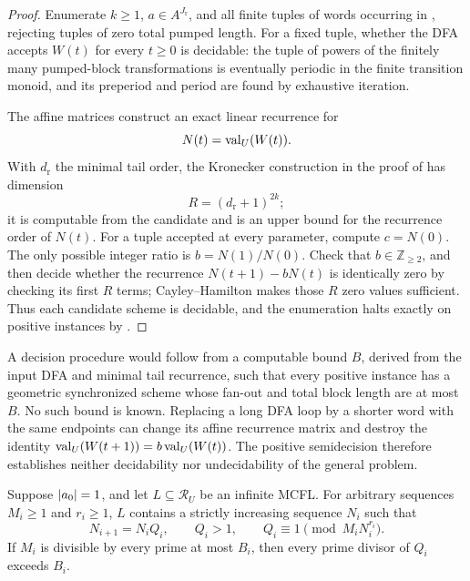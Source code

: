 \begin{proof}
  Enumerate \(k\ge1\), \(a\in A^{J_{\mathrm r}}\), and all finite tuples
  of words occurring in
  , rejecting tuples of zero
  total pumped length. For a fixed tuple, whether the DFA accepts
  \(W(t)\) for every \(t\ge0\) is decidable: the tuple of powers of the
  finitely many pumped-block transformations is eventually periodic in
  the finite transition monoid, and its preperiod and period are found
  by exhaustive iteration.

  The affine matrices construct an exact linear recurrence for
  \[
    N(t)=\operatorname{val}_U(W(t)).
  \]
  With \(d_{\mathrm r}\) the minimal tail order, the Kronecker construction
  in the proof of
   has dimension
  \[
    R=(d_{\mathrm r}+1)^{2k};
  \]
  it is computable from the candidate and is an upper bound for the
  recurrence order of \(N(t)\). For a tuple accepted at every parameter,
  compute \(c=N(0)\). The only
  possible integer ratio is \(b=N(1)/N(0)\). Check that
  \(b\in\mathbb Z_{\ge2}\), and then decide whether the recurrence
  \(N(t+1)-bN(t)\) is identically zero by checking its first \(R\) terms;
  Cayley--Hamilton makes those \(R\) zero values sufficient. Thus each
  candidate scheme is decidable, and the enumeration halts exactly on
  positive instances by
  .
\end{proof}

\begin{remark}
  \label{rem:general-decision-interface}
  A decision procedure would follow from a computable bound \(B\), derived
  from the input DFA and minimal tail recurrence, such that every positive
  instance has a geometric synchronized scheme whose fan-out and total
  block length are at most \(B\). No such bound is known. Replacing a long
  DFA loop by a shorter word with the same endpoints can change its affine
  recurrence matrix and destroy the identity
  \(\operatorname{val}_U(W(t+1))=b\operatorname{val}_U(W(t))\). The positive semidecision therefore
  establishes neither decidability nor undecidability of the general
  problem.
\end{remark}

\begin{theorem}
  \label{thm:unit-mcfl-deep-congruence-chain}
  Suppose \(\lvert a_0 \rvert=1\), and let \(L\subseteq\mathcal R_U\) be an
  infinite MCFL. For arbitrary sequences \(M_i\ge1\) and \(r_i\ge1\),
  \(L\) contains a strictly increasing sequence \(N_i\) such that
  \[
    N_{i+1}=N_iQ_i,\qquad Q_i>1,\qquad
    Q_i\equiv1\pmod {M_iN_i^{r_i}}.
  \]
  If \(M_i\) is divisible by every prime at most \(B_i\), then every
  prime divisor of \(Q_i\) exceeds \(B_i\).
\end{theorem}

